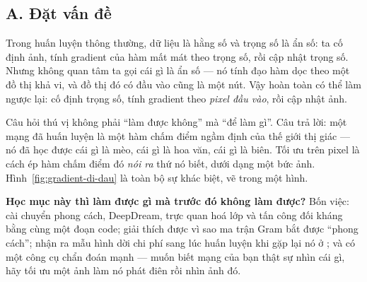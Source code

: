 \documentclass[../../../deep_learning.tex]{subfiles}
\begin{document}
\subsection{A. Đặt vấn đề}
Trong huấn luyện thông thường, dữ liệu là hằng số và trọng số là ẩn số: ta cố định ảnh, tính gradient của hàm mất mát theo trọng số, rồi cập nhật trọng số. Nhưng  không quan tâm ta gọi cái gì là ẩn số --- nó tính đạo hàm dọc theo một đồ thị khả vi, và đồ thị đó có đầu vào cũng là một nút. Vậy hoàn toàn có thể làm ngược lại: cố định trọng số, tính gradient theo \emph{pixel đầu vào}, rồi cập nhật ảnh.

Câu hỏi thú vị không phải ``làm được không'' mà ``để làm gì''. Câu trả lời: một mạng đã huấn luyện là một hàm chấm điểm ngầm định của thế giới thị giác --- nó đã học được cái gì là mèo, cái gì là hoa văn, cái gì là biên. Tối ưu trên pixel là cách ép hàm chấm điểm đó \emph{nói ra} thứ nó biết, dưới dạng một bức ảnh. Hình~\ref{fig:gradient-di-dau} là toàn bộ sự khác biệt, vẽ trong một hình.

\textbf{Học mục này thì làm được gì mà trước đó không làm được?} Bốn việc: cài chuyển phong cách, DeepDream, trực quan hoá lớp và tấn công đối kháng bằng cùng một đoạn code; giải thích được vì sao ma trận Gram bắt được ``phong cách''; nhận ra mẫu hình dời chi phí sang lúc huấn luyện khi gặp lại nó ở ; và có một công cụ chẩn đoán mạnh --- muốn biết mạng của bạn thật sự nhìn cái gì, hãy tối ưu một ảnh làm nó phát điên rồi nhìn ảnh đó.
\end{document}
